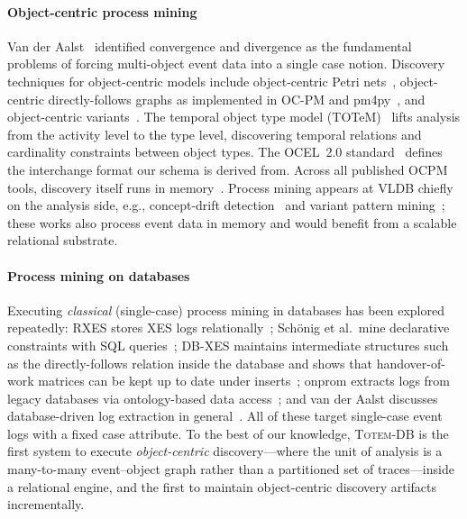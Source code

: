 \documentclass[sigconf, nonacm]{acmart}
\newcommand{\sys}{\textsc{Totem-DB}\xspace}
\newcommand{\ocel}{OCEL~2.0\xspace}
\begin{document}
\paragraph{Object-centric process mining}
Van der Aalst~\cite{aalst2019ocpm} identified convergence and divergence as the fundamental problems of forcing multi-object event data into a single case notion. Discovery techniques for object-centric models include object-centric Petri nets~\cite{aalst2020ocpn}, object-centric directly-follows graphs as implemented in OC-PM and pm4py~\cite{berti2023ocpm,pm4py}, and object-centric variants~\cite{adams2022variants}. The temporal object type model (TOTeM)~\cite{liss2024totem} lifts analysis from the activity level to the type level, discovering temporal relations and cardinality constraints between object types. The \ocel standard~\cite{ocel1,ocel2} defines the interchange format our schema is derived from. Across all published OCPM tools, discovery itself runs in memory~\cite{pm4py,ocpa,adams2021ocpi}. Process mining appears at VLDB chiefly on the analysis side, e.g., concept-drift detection~\cite{adams2023drift} and variant pattern mining~\cite{martini2023infix}; these works also process event data in memory and would benefit from a scalable relational substrate.

\paragraph{Process mining on databases}
Executing \emph{classical} (single-case) process mining in databases has been explored repeatedly: RXES stores XES logs relationally~\cite{vandongen2015rxes}; Sch\"onig et al.\ mine declarative constraints with SQL queries~\cite{schonig2016sql}; DB-XES maintains intermediate structures such as the directly-follows relation inside the database and shows that handover-of-work matrices can be kept up to date under inserts~\cite{syamsiyah2016dbxes}; onprom extracts logs from legacy databases via ontology-based data access~\cite{calvanese2017obda}; and van der Aalst discusses database-driven log extraction in general~\cite{aalst2015extracting}. All of these target single-case event logs with a fixed case attribute. To the best of our knowledge, \sys is the first system to execute \emph{object-centric} discovery---where the unit of analysis is a many-to-many event--object graph rather than a partitioned set of traces---inside a relational engine, and the first to maintain object-centric discovery artifacts incrementally.
\end{document}
